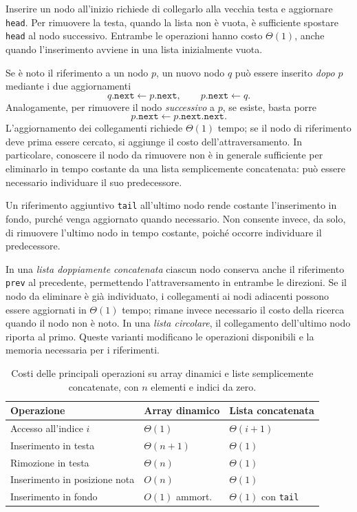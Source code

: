 Inserire un nodo all'inizio richiede di collegarlo alla vecchia
testa e aggiornare \texttt{head}. Per rimuovere la testa,
quando la lista non è vuota, è sufficiente spostare \texttt{head}
al nodo successivo. Entrambe le operazioni hanno costo
\(\Theta(1)\), anche quando l'inserimento avviene in una lista
inizialmente vuota.

Se è noto il riferimento a un nodo \(p\), un nuovo nodo \(q\)
può essere inserito \emph{dopo} \(p\) mediante i due aggiornamenti
\[
  q.\texttt{next}\gets p.\texttt{next},
  \qquad p.\texttt{next}\gets q.
\]
Analogamente, per rimuovere il nodo \emph{successivo} a \(p\),
se esiste, basta porre
\[
  p.\texttt{next}\gets p.\texttt{next.next}.
\]
L'aggiornamento dei collegamenti richiede \(\Theta(1)\) tempo;
se il nodo di riferimento deve prima essere cercato, si aggiunge
il costo dell'attraversamento. In particolare, conoscere il nodo
da rimuovere non è in generale sufficiente per eliminarlo in
tempo costante da una lista semplicemente concatenata: può
essere necessario individuare il suo predecessore.

Un riferimento aggiuntivo \texttt{tail} all'ultimo nodo rende
costante l'inserimento in fondo, purché venga aggiornato quando
necessario. Non consente invece, da solo, di rimuovere l'ultimo
nodo in tempo costante, poiché occorre individuare il predecessore.

In una \emph{lista doppiamente concatenata} ciascun nodo conserva
anche il riferimento \texttt{prev} al precedente, permettendo
l'attraversamento in entrambe le direzioni. Se il nodo da
eliminare è già individuato, i collegamenti ai nodi adiacenti
possono essere aggiornati in \(\Theta(1)\) tempo; rimane invece
necessario il costo della ricerca quando il nodo non è noto.
In una \emph{lista circolare}, il collegamento dell'ultimo nodo
riporta al primo. Queste varianti modificano le operazioni
disponibili e la memoria necessaria per i riferimenti.

\begin{table}[htbp]
  \centering
  \small
  \begin{tabular}{lll}
    \toprule
    Operazione & Array dinamico & Lista concatenata\\
    \midrule
    Accesso all'indice \(i\) & \(\Theta(1)\) & \(\Theta(i+1)\)\\
    Inserimento in testa & \(\Theta(n+1)\) & \(\Theta(1)\)\\
    Rimozione in testa & \(\Theta(n)\) & \(\Theta(1)\)\\
    Inserimento in posizione nota & \(O(n)\) & \(\Theta(1)\)\\
    Inserimento in fondo & \(O(1)\) ammort. & \(\Theta(1)\) con \texttt{tail}\\
    \bottomrule
  \end{tabular}
  \caption{Costi delle principali operazioni su array dinamici
  e liste semplicemente concatenate, con \(n\) elementi
  e indici da zero.}
  \label{tab:fi-array-concatenata-costi}
\end{table}


